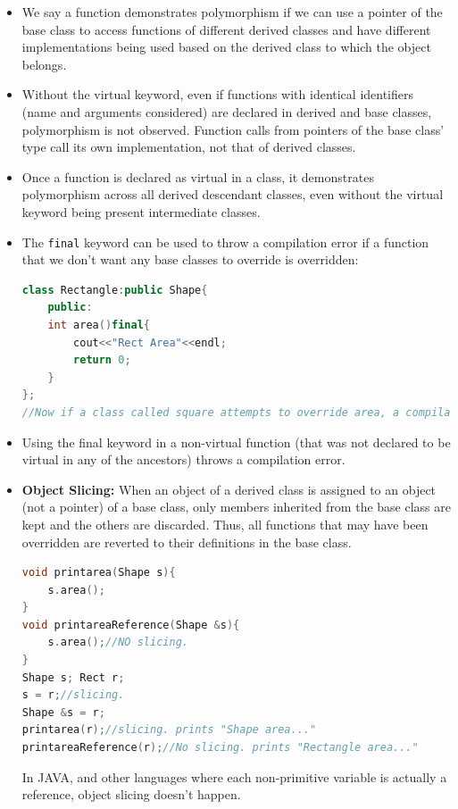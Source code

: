 \documentclass{report}
\begin{document}
\begin{itemize}
\item We say a function demonstrates polymorphism if we can use a pointer of the base class
to access functions of different derived classes and have different implementations
being used based on the derived class to which the object belongs. 
\item Without the virtual keyword, even if functions with identical identifiers (name
and arguments considered) are declared in derived and base classes, polymorphism is not
observed. Function calls from pointers of the base class' type call its own implementation,
not that of derived classes. 
\item Once a function is declared as virtual in a class, it demonstrates polymorphism 
across all derived descendant classes, even without the virtual keyword being present 
intermediate classes.
\item The \texttt{final} keyword can be used to throw a compilation error if a function
that we don't want any base classes to override is overridden:
\begin{lstlisting}[language=C++]
class Rectangle:public Shape{
    public:
    int area()final{
        cout<<"Rect Area"<<endl;
        return 0;
    }
};
//Now if a class called square attempts to override area, a compilation error is thrown.
\end{lstlisting}
\item Using the final keyword in a non-virtual function (that was not declared to be virtual in any of the ancestors) throws a compilation error.
\item \textbf{Object Slicing:} When an object of a derived class is assigned to an object (not a pointer) of
a base class, only members inherited from the base class are kept and the others are discarded. Thus,
all functions that may have been overridden are reverted to their definitions in the base class.
\begin{lstlisting}[language=C++]
void printarea(Shape s){
    s.area();
}
void printareaReference(Shape &s){
    s.area();//NO slicing. 
}
Shape s; Rect r;
s = r;//slicing.
Shape &s = r;
printarea(r);//slicing. prints "Shape area..."
printareaReference(r);//No slicing. prints "Rectangle area..."
\end{lstlisting}
In JAVA, and other languages where each non-primitive variable is actually a reference, object
slicing doesn't happen.
\end{itemize}
\end{document}
